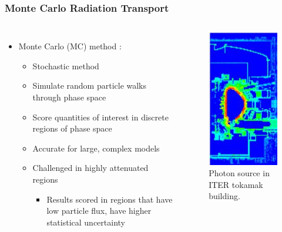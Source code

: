 \documentclass{beamer}
\begin{document}
\begin{frame}
\frametitle{Monte Carlo Radiation Transport}
\begin{columns}
\begin{itemize}
	\item{Monte Carlo (MC) method \cite{mcnp_manual}:}%
	\begin{itemize}
		\item{Stochastic method}
		\item{Simulate random particle walks through phase space}
	        \item{Score quantities of interest 
		in discrete regions of phase space}
		\item{Accurate for large, complex models}
		\item{Challenged in highly attenuated regions}
                  \begin{itemize}
                  \item{Results scored in regions that have low particle flux, have higher statistical uncertainty}
                  \end{itemize}
	\end{itemize}
\end{itemize}

\begin{figure}
	\centering
	\includegraphics[scale=0.5]{iter_pflux.jpg}
	\caption{Photon source in ITER tokamak building.}
\end{figure}

\end{columns}
\end{frame}
\end{document}
